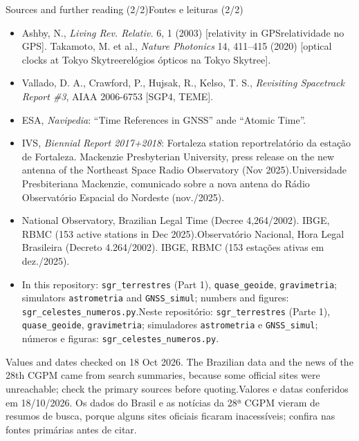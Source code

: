 \documentclass[aspectratio=169,11pt]{beamer}
\newcommand{\tr}[2]{\ifEN#2\else#1\fi}
\begin{document}
\begin{frame}{\tr{Fontes e leituras (2/2)}{Sources and further reading (2/2)}}
  \scriptsize
  \begin{itemize}
    \setlength{\itemsep}{1.5pt}
    \item Ashby, N., \emph{Living Rev. Relativ.} 6, 1 (2003) [\tr{relatividade no GPS}{relativity in GPS}]. Takamoto, M. et al., \emph{Nature Photonics} 14, 411--415 (2020) [\tr{relógios ópticos na Tokyo Skytree}{optical clocks at Tokyo Skytree}].
    \item Vallado, D. A., Crawford, P., Hujsak, R., Kelso, T. S., \emph{Revisiting Spacetrack Report \#3}, AIAA 2006-6753 [SGP4, TEME].
    \item ESA, \emph{Navipedia}: ``Time References in GNSS'' \tr{e}{and} ``Atomic Time''.
    \item IVS, \emph{Biennial Report 2017+2018}: \tr{relatório da estação de Fortaleza}{Fortaleza station report}. \tr{Universidade Presbiteriana Mackenzie, comunicado sobre a nova antena do Rádio Observatório Espacial do Nordeste (nov./2025).}{Mackenzie Presbyterian University, press release on the new antenna of the Northeast Space Radio Observatory (Nov 2025).}
    \item \tr{Observatório Nacional, Hora Legal Brasileira (Decreto 4.264/2002). IBGE, RBMC (153 estações ativas em dez./2025).}{National Observatory, Brazilian Legal Time (Decree 4,264/2002). IBGE, RBMC (153 active stations in Dec 2025).}
    \item \tr{Neste repositório: \texttt{sgr\_terrestres} (Parte 1), \texttt{quase\_geoide}, \texttt{gravimetria}; simuladores \texttt{astrometria} e \texttt{GNSS\_simul}; números e figuras: \texttt{sgr\_celestes\_numeros.py}.}{In this repository: \texttt{sgr\_terrestres} (Part 1), \texttt{quase\_geoide}, \texttt{gravimetria}; simulators \texttt{astrometria} and \texttt{GNSS\_simul}; numbers and figures: \texttt{sgr\_celestes\_numeros.py}.}
  \end{itemize}
  \medskip

  \begin{ideia}
    \footnotesize\tr{Valores e datas conferidos em 18/10/2026. Os dados do Brasil e as notícias da 28ª CGPM vieram de resumos de busca, porque alguns sites oficiais ficaram inacessíveis; confira nas fontes primárias antes de citar.}{Values and dates checked on 18 Oct 2026. The Brazilian data and the news of the 28th CGPM came from search summaries, because some official sites were unreachable; check the primary sources before quoting.}
  \end{ideia}
\end{frame}
\end{document}
